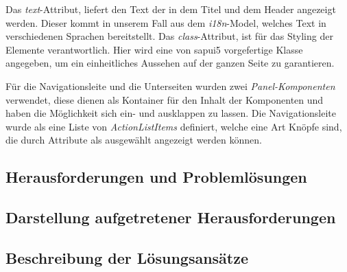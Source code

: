 Das \textit{text}-Attribut, liefert den Text der in dem Titel und dem Header angezeigt werden.
Dieser kommt in unserem Fall aus dem \textit{i18n}-Model, welches Text in verschiedenen Sprachen bereitstellt.
Das \textit{class}-Attribut, ist für das Styling der Elemente verantwortlich. 
Hier wird eine von \gls{sapui5} vorgefertige Klasse angegeben, um ein einheitliches Aussehen auf der ganzen Seite zu garantieren.

Für die Navigationsleite und die Unterseiten wurden zwei \textit{Panel-Komponenten} verwendet, diese dienen als Kontainer für den Inhalt der Komponenten und haben die Möglichkeit sich ein- und ausklappen zu lassen.
Die Navigationsleite wurde als eine Liste von \textit{ActionListItems} definiert, welche eine Art Knöpfe sind, die durch Attribute als ausgewählt angezeigt werden können.

\subsection[Herausforderungen und Problemlösungen]{Herausforderungen und Problemlösungen}

\subsection[Darstellung aufgetretener Herausforderungen]{Darstellung aufgetretener Herausforderungen}

\subsection[Beschreibung der Lösungsansätze]{Beschreibung der Lösungsansätze}
